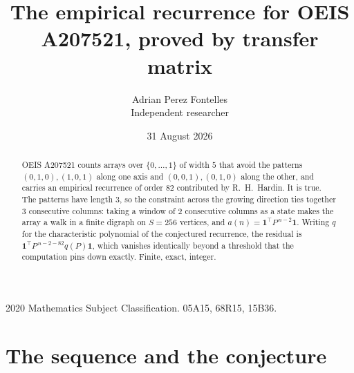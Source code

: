 \documentclass[11pt,a4paper]{article}
\title{The empirical recurrence for OEIS A207521, proved by transfer matrix}
\author{Adrian Perez Fontelles\\ \small Independent researcher}
\date{31 August 2026}
\theoremstyle{plain}
\theoremstyle{definition}
\begin{document}
\maketitle

\begin{abstract}
OEIS A207521 counts arrays over $\{0,\dots,1\}$ of width $5$ that avoid the patterns
$(0,1,0), (1,0,1)$ along one axis and $(0,0,1), (0,1,0)$ along the other, and carries an empirical recurrence of
order $82$ contributed by R.~H.~Hardin. It is true. The patterns have length $3$, so
the constraint across the growing direction ties together $3$ consecutive columns: taking a
window of $2$ consecutive columns as a state makes the array a walk in a finite digraph
on $S=256$ vertices, and $a(n)=\mathbf{1}^{\!\top}P^{\,n-2}\mathbf{1}$. Writing $q$
for the characteristic polynomial of the conjectured recurrence, the residual is
$\mathbf{1}^{\!\top}P^{\,n-2-82}q(P)\mathbf{1}$, which vanishes identically
beyond a threshold that the computation pins down exactly. Finite, exact, integer.
\end{abstract}

\noindent\small 2020 Mathematics Subject Classification. 05A15, 68R15, 15B36.\normalsize

\section{The sequence and the conjecture}
\end{document}
